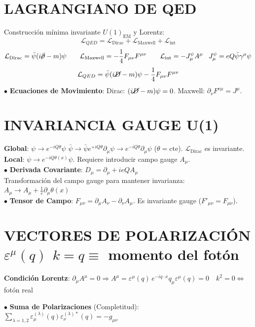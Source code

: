 \section{LAGRANGIANO DE QED}
Construcción mínima invariante $U(1)_{\text{EM}}$ y Lorentz:
$$\mathcal{L}_{QED} = \mathcal{L}_{\text{Dirac}} + \mathcal{L}_{\text{Maxwell}} + \mathcal{L}_{\text{int}}$$
$$\mathcal{L}_{\text{Dirac}}=  \bar{\psi} (i \cancel{\partial} - m) \psi \qquad \mathcal{L}_{\text{Maxwell}} = -\frac{1}{4} F_{\mu \nu }F^{\mu \nu} \qquad \mathcal{L}_{\text{int}} =-J_\mu^\psi A^\mu \;\;\; J_\mu^\psi = eQ\bar{\psi}\gamma^\mu\psi$$
$$\mathcal{L}_{QED} = \bar{\psi}(i\cancel{D} - m)\psi - \frac{1}{4}F_{\mu\nu}F^{\mu\nu}$$
$\bullet$ \textbf{Ecuaciones de Movimiento}:
Dirac: $(i\cancel{D} - m)\psi = 0$.
Maxwell: $\partial_\nu F^{\nu\mu} = J^\mu$.


\section{INVARIANCIA GAUGE U(1)}
\textbf{Global}: $\psi \to e^{-iQ\theta}\psi$ \;\; $\bar{\psi} \to \bar{\psi}e^{+iQ\theta}$\;\;$\partial_\mu\psi \to e^{-iQ\theta}\partial_\mu\psi$ ($\theta = \text{cte}$). $\mathcal{L}_{\text{Dirac}}$ es invariante.\\
\textbf{Local}: $\psi \to e^{-iQ\theta(x)}\psi$. Requiere introducir campo gauge $A_\mu$.\\
$\bullet$ \textbf{Derivada Covariante}: $ D_\mu = \partial_\mu + ieQA_\mu$
\\Transformación del campo gauge para mantener invarianza:
$A_\mu \to A_\mu + \frac{1}{e}\partial_\mu \theta(x)$\\

$\bullet$ \textbf{Tensor de Campo}: $F_{\mu\nu} = \partial_\mu A_\nu - \partial_\nu A_\mu$. Es invariante gauge ($F'_{\mu\nu} = F_{\mu\nu}$).




\section{VECTORES DE POLARIZACIÓN $\varepsilon^\mu (q)$ \qquad $k = q \equiv$ momento del fotón}

\textbf{Condición Lorentz}: $\partial_\mu A^\mu \!= \!0 \!\Rightarrow \!A^\mu = \varepsilon^\mu (q) \, e^{-iq\cdot x}$\quad$q_\mu \varepsilon^\mu(q)\!=\!0\quad k^2\!=\! 0\Leftrightarrow$ fotón real


$\bullet$ \textbf{Suma de Polarizaciones} (Completitud): $ \sum_{\lambda=1,2} \varepsilon_\mu^{(\lambda)} (q) \varepsilon_\nu^{(\lambda)*}(q) = -g_{\mu\nu} $\\

